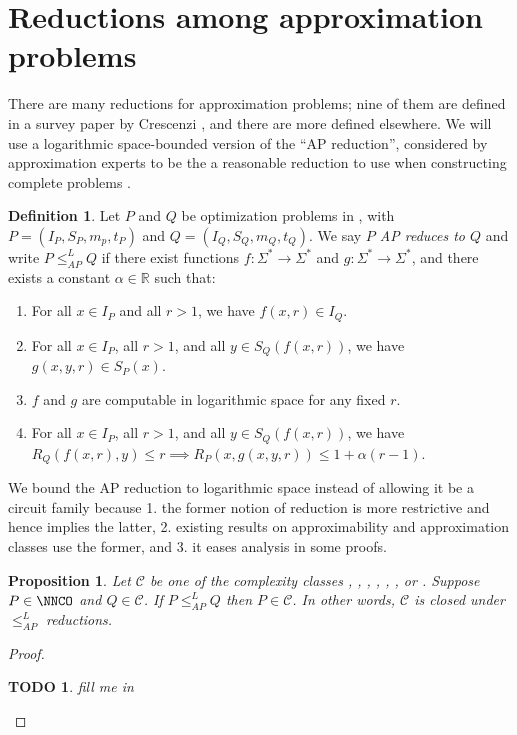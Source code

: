 \documentclass[]{article}
\theoremstyle{plain}
\newtheorem{proposition}{Proposition}
\newtheorem{todo}{TODO}
\theoremstyle{definition}
\newtheorem{definition}{Definition}
\newcommand{\APr}{\leq_{AP}^{L}}
\begin{document}
\section{Reductions among approximation problems}

There are many reductions for approximation problems; nine of them are defined in a survey paper by Crescenzi \cite{crescenzi97}, and there are more defined elsewhere.
We will use a logarithmic space-bounded version of the ``AP reduction'', considered by approximation experts to be the a reasonable reduction to use when constructing complete problems \cite[Section~2]{crescenzi97} \cite[Section~8.6]{acgkmp99}.

\begin{definition}{\cite[Definition~9]{ckst95}}
  Let $P$ and $Q$ be optimization problems in \NNCO, with $P=(I_P, S_P, m_p, t_P)$ and $Q=(I_Q, S_Q, m_Q, t_Q)$.
  We say \emph{$P$ AP reduces to $Q$} and write $P\APr Q$ if there exist functions $f\colon\Sigma^*\to\Sigma^*$ and $g\colon\Sigma^*\to\Sigma^*$, and there exists a constant $\alpha\in\mathbb{R}$ such that:
  \begin{enumerate}
  \item For all $x\in I_P$ and all $r > 1$, we have $f(x, r)\in I_Q$.
  \item For all $x\in I_P$, all $r > 1$, and all $y\in S_Q(f(x, r))$, we have $g(x, y, r)\in S_P(x)$.
  \item $f$ and $g$ are computable in logarithmic space for any fixed $r$.
  \item For all $x\in I_P$, all $r > 1$, and all $y\in S_Q(f(x, r))$, we have $R_Q(f(x, r), y) \leq r \implies R_P(x, g(x, y, r)) \leq 1 + \alpha(r - 1)$.
  \end{enumerate}
\end{definition}

We bound the AP reduction to logarithmic space instead of allowing it be a \FNC{} circuit family because 1. the former notion of reduction is more restrictive and hence implies the latter, 2. existing results on approximability and approximation classes use the former, and 3. it eases analysis in some proofs.

\begin{proposition}
  Let $\mathcal{C}$ be one of the complexity classes \NCO, \NCAS, \ApxNCO, \logApxNCO, \polyApxNCO, \expApxNCO, or \NNCO.
  Suppose $P\in\NNCO$ and $Q\in\mathcal{C}$.
  If $P\APr Q$ then $P\in \mathcal{C}$.
  In other words, $\mathcal{C}$ is closed under $\APr$ reductions.
\end{proposition}
\begin{proof}
  \begin{todo}
    fill me in
  \end{todo}
\end{proof}
\end{document}
